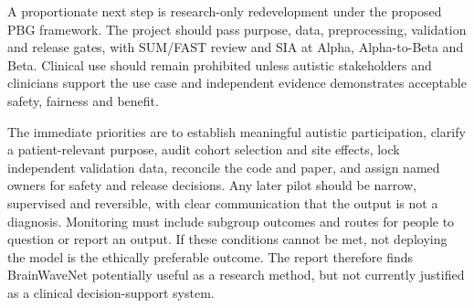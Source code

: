 \documentclass[11pt,a4paper]{article}
\begin{document}
A proportionate next step is research-only redevelopment under the proposed PBG framework. The project should pass purpose, data, preprocessing, validation and release gates, with SUM/FAST review and SIA at Alpha, Alpha-to-Beta and Beta. Clinical use should remain prohibited unless autistic stakeholders and clinicians support the use case and independent evidence demonstrates acceptable safety, fairness and benefit.

The immediate priorities are to establish meaningful autistic participation, clarify a patient-relevant purpose, audit cohort selection and site effects, lock independent validation data, reconcile the code and paper, and assign named owners for safety and release decisions. Any later pilot should be narrow, supervised and reversible, with clear communication that the output is not a diagnosis. Monitoring must include subgroup outcomes and routes for people to question or report an output. If these conditions cannot be met, not deploying the model is the ethically preferable outcome. The report therefore finds BrainWaveNet potentially useful as a research method, but not currently justified as a clinical decision-support system.

\printbibliography[heading=bibintoc,title={References}]
\end{document}
